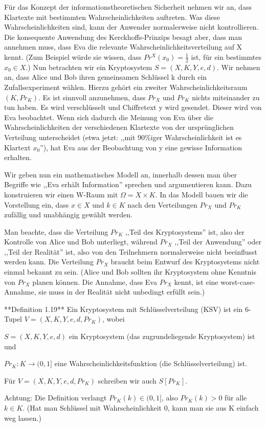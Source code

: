 \documentclass[a4paper]{article}
\begin{document}
\begin{multicols}{3}
    Für das Konzept der informationstheoretischen Sicherheit nehmen wir an, dass Klartexte mit bestimmten Wahrscheinlichkeiten auftreten. Was diese Wahrscheinlichkeiten sind, kann der Anwender normalerweise nicht kontrollieren. Die konsequente Anwendung des Kerckhoffs-Prinzips besagt aber, dass man annehmen muss, dass Eva die relevante Wahrscheinlichkeitsverteilung auf X kennt. (Zum Beispiel würde sie wissen, dass $Pr^X(x_0)=\frac{1}{2}$ ist, für ein bestimmtes $x_0\in X$.) Nun betrachten wir ein Kryptosystem $S=(X,K,Y,e,d)$. Wir nehmen an, dass Alice und Bob ihren gemeinsamen Schlüssel k durch ein Zufallsexperiment wählen. Hierzu gehört ein zweiter Wahrscheinlichkeitsraum $(K,Pr_K)$. Es ist sinnvoll anzunehmen, dass $Pr_X$ und $Pr_K$ nichts miteinander zu tun haben. Es wird verschlüsselt und Chiffretext y wird gesendet. Dieser wird von Eva beobachtet. Wenn sich dadurch die Meinung von Eva über die Wahrscheinlichkeiten der verschiedenen Klartexte von der ursprünglichen Verteilung unterscheidet (etwa jetzt: ,,mit 90\%iger Wahrscheinlichkeit ist es Klartext $x_0$''), hat Eva aus der Beobachtung von y eine gewisse Information erhalten.

    Wir geben nun ein mathematisches Modell an, innerhalb dessen man über Begriffe wie ,,Eva erhält Information'' sprechen und argumentieren kann. Dazu konstruieren wir einen W-Raum mit $\Omega=X\times K$. In das Modell bauen wir die Vorstellung ein, dass $x\in X$ und $k\in K$ nach den Verteilungen $Pr_X$ und $Pr_K$ zufällig und unabhängig gewählt werden.

    Man beachte, dass die Verteilung $Pr_K$ ,,Teil des Kryptosystems'' ist, also der Kontrolle von Alice und Bob unterliegt, während $Pr_X$ ,,Teil der Anwendung'' oder ,,Teil der Realität'' ist, also von den Teilnehmern normalerweise nicht beeinflusst werden kann. Die Verteilung $Pr_X$ braucht beim Entwurf des Kryptosystems nicht einmal bekannt zu sein. (Alice und Bob sollten ihr Kryptosystem ohne Kenntnis von $Pr_X$ planen können. Die Annahme, dass Eva $Pr_X$ kennt, ist eine worst-case-Annahme, sie muss in der Realität nicht unbedingt erfüllt sein.)

    **Definition 1.19** Ein Kryptosystem mit Schlüsselverteilung (KSV) ist ein 6-Tupel $V=(X,K,Y,e,d,Pr_K)$, wobei
    \begin{itemize*}
        \item $S=(X,K,Y,e,d)$ ein Kryptosystem (das zugrundeliegende Kryptosystem) ist und
        \item $Pr_K:K\rightarrow (0,1]$ eine Wahrscheinlichkeitsfunktion (die Schlüsselverteilung) ist.
        \item Für $V=(X,K,Y,e,d,Pr_K)$ schreiben wir auch $S[Pr_K]$.
        \item Achtung: Die Definition verlangt $Pr_K(k)\in (0,1]$, also $Pr_K(k)> 0$ für alle $k\in K$. (Hat man Schlüssel mit Wahrscheinlichkeit 0, kann man sie aus K einfach weg lassen.)
    \end{itemize*}


\end{multicols}
\end{document}
